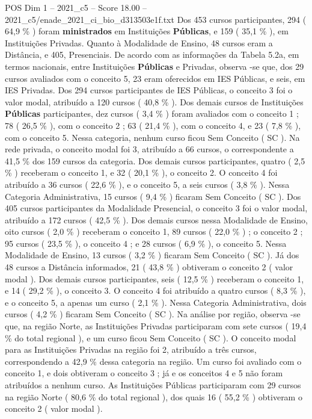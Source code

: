 \begin{textsample}{POS Dim 1 – 2021\_c5 – Score 18.00 – 2021\_c5/enade\_2021\_ci\_bio\_d313503e1f.txt}
Dos 453 cursos participantes, 294 ( 64,9 \% ) foram \textbf{ministrados} em Instituições \textbf{Públicas}, e 159 ( 35,1 \% ), em Instituições Privadas.
Quanto à Modalidade de Ensino, 48 cursos eram a Distância, e 405, Presenciais.
De acordo com as informações da Tabela 5.2a, em termos nacionais, entre Instituições \textbf{Públicas} e Privadas, observa -se que, dos 29 cursos avaliados com o conceito 5, 23 eram oferecidos em IES Públicas, e seis, em IES Privadas.
Dos 294 cursos participantes de IES Públicas, o conceito 3 foi o valor modal, atribuído a 120 cursos ( 40,8 \% ).
Dos demais cursos de Instituições \textbf{Públicas} participantes, dez cursos ( 3,4 \% ) foram avaliados com o conceito 1 ; 78 ( 26,5 \% ), com o conceito 2 ; 63 ( 21,4 \% ), com o conceito 4, e 23 ( 7,8 \% ), com o conceito 5.
Nessa categoria, nenhum curso ficou Sem Conceito ( SC ).
Na rede privada, o conceito modal foi 3, atribuído a 66 cursos, o correspondente a 41,5 \% dos 159 cursos da categoria.
Dos demais cursos participantes, quatro ( 2,5 \% ) receberam o conceito 1, e 32 ( 20,1 \% ), o conceito 2.
O conceito 4 foi atribuído a 36 cursos ( 22,6 \% ), e o conceito 5, a seis cursos ( 3,8 \% ).
Nessa Categoria Administrativa, 15 cursos ( 9,4 \% ) ficaram Sem Conceito ( SC ).
Dos 405 cursos participantes da Modalidade Presencial, o conceito 3 foi o valor modal, atribuído a 172 cursos ( 42,5 \% ).
Dos demais cursos nessa Modalidade de Ensino, oito cursos ( 2,0 \% ) receberam o conceito 1, 89 cursos ( 22,0 \% ) ; o conceito 2 ; 95 cursos ( 23,5 \% ), o conceito 4 ; e 28 cursos ( 6,9 \% ), o conceito 5.
Nessa Modalidade de Ensino, 13 cursos ( 3,2 \% ) ficaram Sem Conceito ( SC ).
Já dos 48 cursos a Distância informados, 21 ( 43,8 \% ) obtiveram o conceito 2 ( valor modal ).
Dos demais cursos participantes, seis ( 12,5 \% ) receberam o conceito 1, e 14 ( 29,2 \% ), o conceito 3.
O conceito 4 foi atribuído a quatro cursos ( 8,3 \% ), e o conceito 5, a apenas um curso ( 2,1 \% ).
Nessa Categoria Administrativa, dois cursos ( 4,2 \% ) ficaram Sem Conceito ( SC ).
Na análise por região, observa -se que, na região Norte, as Instituições Privadas participaram com sete cursos ( 19,4 \% do total regional ), e um curso ficou Sem Conceito ( SC ).
O conceito modal para as Instituições Privadas na região foi 2, atribuído a três cursos, correspondendo a 42,9 \% dessa categoria na região.
Um curso foi avaliado com o conceito 1, e dois obtiveram o conceito 3 ; já e os conceitos 4 e 5 não foram atribuídos a nenhum curso.
As Instituições Públicas participaram com 29 cursos na região Norte ( 80,6 \% do total regional ), dos quais 16 ( 55,2 \% ) obtiveram o conceito 2 ( valor modal ).

\end{textsample}
